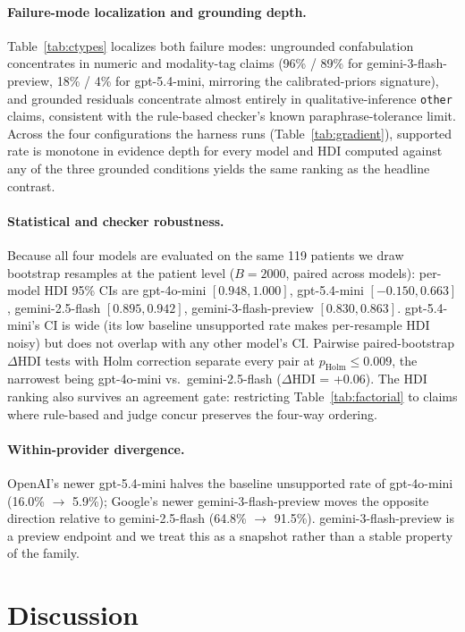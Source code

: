 \documentclass{article}
\theoremstyle{plain}
\begin{document}
\paragraph{Failure-mode localization and grounding depth.} Table~\ref{tab:ctypes} localizes both failure modes: ungrounded confabulation concentrates in numeric and modality-tag claims (96\% / 89\% for gemini-3-flash-preview, 18\% / 4\% for gpt-5.4-mini, mirroring the calibrated-priors signature), and grounded residuals concentrate almost entirely in qualitative-inference \texttt{other} claims, consistent with the rule-based checker's known paraphrase-tolerance limit. Across the four configurations the harness runs (Table~\ref{tab:gradient}), supported rate is monotone in evidence depth for every model and HDI computed against any of the three grounded conditions yields the same ranking as the headline contrast.

\paragraph{Statistical and checker robustness.} Because all four models are evaluated on the same 119 patients we draw bootstrap resamples at the patient level ($B{=}2000$, paired across models): per-model HDI 95\% CIs are gpt-4o-mini $[0.948, 1.000]$, gpt-5.4-mini $[-0.150, 0.663]$, gemini-2.5-flash $[0.895, 0.942]$, gemini-3-flash-preview $[0.830, 0.863]$. gpt-5.4-mini's CI is wide (its low baseline unsupported rate makes per-resample HDI noisy) but does not overlap with any other model's CI. Pairwise paired-bootstrap $\Delta$HDI tests with Holm correction separate every pair at $p_{\text{Holm}} \leq 0.009$, the narrowest being gpt-4o-mini vs.\ gemini-2.5-flash ($\Delta$HDI = +0.06). The HDI ranking also survives an agreement gate: restricting Table~\ref{tab:factorial} to claims where rule-based and judge concur preserves the four-way ordering.

\paragraph{Within-provider divergence.} OpenAI's newer gpt-5.4-mini halves the baseline unsupported rate of gpt-4o-mini (16.0\% $\to$ 5.9\%); Google's newer gemini-3-flash-preview moves the opposite direction relative to gemini-2.5-flash (64.8\% $\to$ 91.5\%). gemini-3-flash-preview is a preview endpoint and we treat this as a snapshot rather than a stable property of the family.

\section{Discussion}
\label{sec:discussion}
\end{document}
